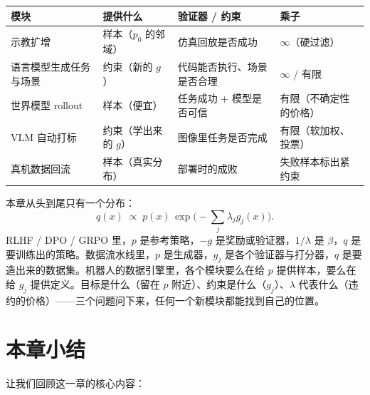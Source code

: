 \begin{center}
\renewcommand{\arraystretch}{1.3}
\small
\begin{tabular}{@{}p{2.9cm}p{2.5cm}p{3.4cm}p{2.7cm}@{}}
\toprule
\textbf{模块} & \textbf{提供什么} & \textbf{验证器 / 约束} & \textbf{乘子} \\
\midrule
示教扩增 & 样本（$p_0$ 的邻域） & 仿真回放是否成功 & $\infty$（硬过滤） \\
语言模型生成任务与场景 & 约束（新的 $g$） & 代码能否执行、场景是否合理 & $\infty$ / 有限 \\
世界模型 rollout & 样本（便宜） & 任务成功 + 模型是否可信 & 有限（不确定性的价格） \\
VLM 自动打标 & 约束（学出来的 $g$） & 图像里任务是否完成 & 有限（软加权、投票） \\
真机数据回流 & 样本（真实分布） & 部署时的成败 & 失败样本标出紧约束 \\
\bottomrule
\end{tabular}
\end{center}

\begin{unification}[title=统一视角：策略、数据、约束]
本章从头到尾只有一个分布：
\[
q(x) \;\propto\; p(x)\,\exp\Big(-\sum_j \lambda_j g_j(x)\Big).
\]
RLHF / DPO / GRPO 里，$p$ 是参考策略，$-g$ 是奖励或验证器，$1/\lambda$ 是 $\beta$，$q$ 是要训练出的策略。数据流水线里，$p$ 是生成器，$g_j$ 是各个验证器与打分器，$q$ 是要造出来的数据集。机器人的数据引擎里，各个模块要么在给 $p$ 提供样本，要么在给 $g_j$ 提供定义。目标是什么（留在 $p$ 附近）、约束是什么（$g_j$）、$\lambda$ 代表什么（违约的价格）——三个问题问下来，任何一个新模块都能找到自己的位置。
\end{unification}

\section{本章小结}

让我们回顾这一章的核心内容：

